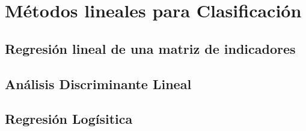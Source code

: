 \section{Métodos lineales para Clasificación}
\subsection{Regresión lineal de una matriz de indicadores}
\subsection{Análisis Discriminante Lineal}
\subsection{Regresión Logísitica}